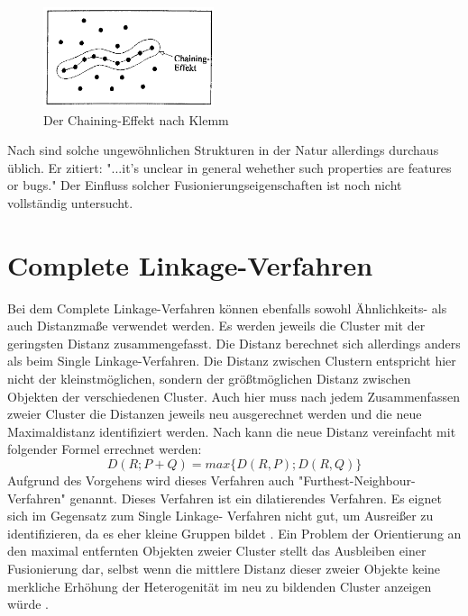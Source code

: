 \begin{figure}[h]
	\begin{center}
		\includegraphics[width=5cm]{pics/klemm19.png}
	\end{center}
	\caption{Der Chaining-Effekt nach Klemm}
	\label{pic:klemm19}
\end{figure}

Nach \citet[S. 416]{Clarke.2009} sind solche ungewöhnlichen Strukturen in der Natur allerdings durchaus üblich. Er zitiert: "...it's unclear in general wehether such properties are features or bugs." Der Einfluss solcher Fusionierungseigenschaften ist noch nicht vollständig untersucht.

\section{Complete Linkage-Verfahren}
Bei dem Complete Linkage-Verfahren können ebenfalls sowohl Ähnlichkeits- als auch Distanzmaße verwendet werden. Es werden jeweils die Cluster mit der geringsten Distanz zusammengefasst. Die Distanz berechnet sich allerdings anders als beim Single Linkage-Verfahren. Die Distanz zwischen Clustern entspricht hier nicht der kleinstmöglichen, sondern der größtmöglichen Distanz zwischen Objekten der verschiedenen Cluster. Auch hier muss nach jedem Zusammenfassen zweier Cluster die Distanzen jeweils neu ausgerechnet werden und die neue Maximaldistanz identifiziert werden.
Nach \citet{Backhaus.2016} kann die neue Distanz vereinfacht mit folgender Formel errechnet werden:                                                                                                                                                                                                                                                                                                                                                               
\begin{equation}
	D(R;P+Q) = max\{D(R,P);D(R,Q)\}
\end{equation}
Aufgrund des Vorgehens wird dieses Verfahren auch "Furthest-Neighbour-Verfahren" genannt.
Dieses Verfahren ist ein dilatierendes Verfahren. Es eignet sich im Gegensatz zum Single Linkage- Verfahren nicht gut, um Ausreißer zu identifizieren, da es eher kleine Gruppen bildet \citep[Vgl.][S. 483/484]{Backhaus.2016}. Ein Problem der Orientierung an den maximal entfernten Objekten zweier Cluster stellt das Ausbleiben einer Fusionierung dar, selbst wenn die mittlere Distanz dieser zweier Objekte keine merkliche Erhöhung der Heterogenität im neu zu bildenden Cluster anzeigen würde \citep[Vgl.][S. 236]{Eckey.2002}.


